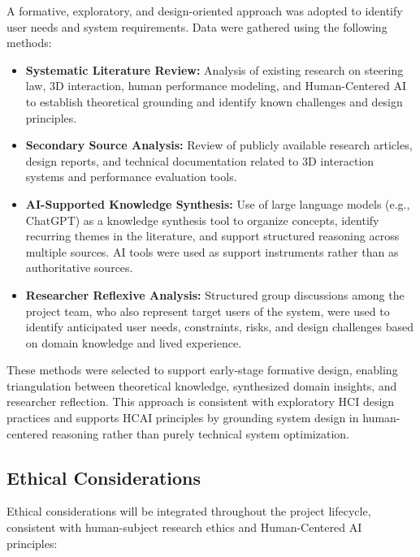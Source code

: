 \documentclass[sigconf]{acmart}
\begin{document}
A formative, exploratory, and design-oriented approach was adopted to identify user needs and system requirements. Data were gathered using the following methods:

\begin{itemize}
  \item \textbf{Systematic Literature Review:} Analysis of existing research on steering law, 3D interaction, human performance modeling, and Human-Centered AI to establish theoretical grounding and identify known challenges and design principles.
  
  \item \textbf{Secondary Source Analysis:} Review of publicly available research articles, design reports, and technical documentation related to 3D interaction systems and performance evaluation tools.
  
  \item \textbf{AI-Supported Knowledge Synthesis:} Use of large language models (e.g., ChatGPT) as a knowledge synthesis tool to organize concepts, identify recurring themes in the literature, and support structured reasoning across multiple sources. AI tools were used as support instruments rather than as authoritative sources.
  
  \item \textbf{Researcher Reflexive Analysis:} Structured group discussions among the project team, who also represent target users of the system, were used to identify anticipated user needs, constraints, risks, and design challenges based on domain knowledge and lived experience.
\end{itemize}

These methods were selected to support early-stage formative design, enabling triangulation between theoretical knowledge, synthesized domain insights, and researcher reflection. This approach is consistent with exploratory HCI design practices and supports HCAI principles by grounding system design in human-centered reasoning rather than purely technical system optimization.

\subsection{Ethical Considerations}

Ethical considerations will be integrated throughout the project lifecycle, consistent with human-subject research ethics and Human-Centered AI principles:
\end{document}
